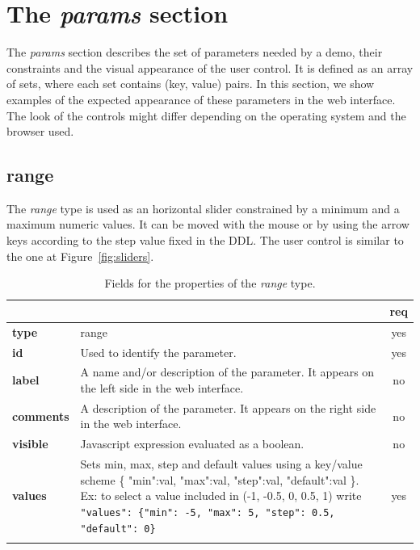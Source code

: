 \section{The \emph{params} section}
The \emph{params} section describes the set of parameters needed by a demo, their constraints and the visual appearance of the user control. It is defined as an array of sets, where each set contains (key, value) pairs. In this section, we show examples of the expected appearance of these parameters in the web interface. The look of the controls might differ depending on the operating system and the browser used.

\subsection{range}

The \emph{range} type is used as an horizontal slider constrained by a minimum and a maximum numeric values. It can be moved with the mouse or by using the arrow keys according to the step value fixed in the DDL. The user control is similar to the one at Figure~\ref{fig:sliders}.

\begin{longtable}{|>{\bf}L{\linewidth}|L{\linewidth}|c|}
\hline
      &  & {\bf req} 
\tabularnewline \hline \hline
 type   & range       & yes \\ \hline
 id     & Used to identify the parameter. & yes \\ \hline
 label  & A name and/or description of the parameter. It appears on the left side in the web interface. & no
                      \\ \hline
 comments & A description of the parameter. It appears on the right side in the web interface. & no
                      \\ \hline
 visible    & Javascript expression evaluated as a boolean. & no \\ \hline
 values & Sets min, max, step and default values using a key/value 
scheme \{ "min":val, "max":val, "step":val, "default":val \}. 
Ex: to select a value included in (-1, -0.5, 0, 0.5, 1) write \texttt{"values": \{"min": -5, "max": 5, "step": 0.5, "default": 0\}}  & yes
                      \\ \hline
\caption{Fields for the properties of the \emph{range} type.}
\end{longtable}

